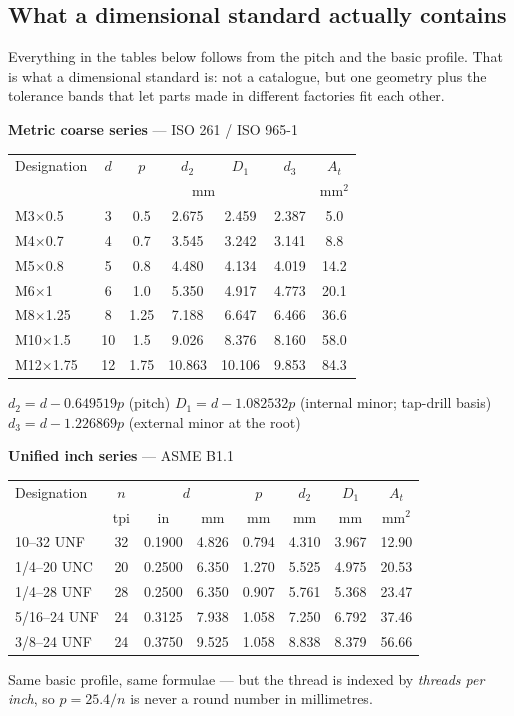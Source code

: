 \documentclass[11pt,a4paper]{article}
\begin{document}
\subsection{What a dimensional standard actually contains}

Everything in the tables below follows from the pitch and the basic profile. That is what a
dimensional standard is: not a catalogue, but one geometry plus the tolerance bands that let parts
made in different factories fit each other.

\begin{center}\footnotesize
\textbf{Metric coarse series} --- ISO 261 / ISO 965-1\\[3pt]
\begin{tabular}{@{}lcccccc@{}}
\toprule
Designation & $d$ & $p$ & $d_2$ & $D_1$ & $d_3$ & $A_t$\\
 & \multicolumn{5}{c}{mm} & mm$^2$\\
\midrule
M3$\times$0.5 & 3 & 0.5 & 2.675 & 2.459 & 2.387 & 5.0\\
M4$\times$0.7 & 4 & 0.7 & 3.545 & 3.242 & 3.141 & 8.8\\
M5$\times$0.8 & 5 & 0.8 & 4.480 & 4.134 & 4.019 & 14.2\\
M6$\times$1 & 6 & 1.0 & 5.350 & 4.917 & 4.773 & 20.1\\
M8$\times$1.25 & 8 & 1.25 & 7.188 & 6.647 & 6.466 & 36.6\\
M10$\times$1.5 & 10 & 1.5 & 9.026 & 8.376 & 8.160 & 58.0\\
M12$\times$1.75 & 12 & 1.75 & 10.863 & 10.106 & 9.853 & 84.3\\
\bottomrule
\end{tabular}

\smallskip
{\scriptsize $d_2=d-0.649519p$ (pitch) \quad $D_1=d-1.082532p$ (internal minor; tap-drill basis)
\quad $d_3=d-1.226869p$ (external minor at the root)}
\end{center}

\begin{center}\footnotesize
\textbf{Unified inch series} --- ASME B1.1\\[3pt]
\begin{tabular}{@{}lccccccc@{}}
\toprule
Designation & $n$ & \multicolumn{2}{c}{$d$} & $p$ & $d_2$ & $D_1$ & $A_t$\\
 & tpi & in & mm & mm & mm & mm & mm$^2$\\
\midrule
10--32 UNF & 32 & 0.1900 & 4.826 & 0.794 & 4.310 & 3.967 & 12.90\\
1/4--20 UNC & 20 & 0.2500 & 6.350 & 1.270 & 5.525 & 4.975 & 20.53\\
1/4--28 UNF & 28 & 0.2500 & 6.350 & 0.907 & 5.761 & 5.368 & 23.47\\
5/16--24 UNF & 24 & 0.3125 & 7.938 & 1.058 & 7.250 & 6.792 & 37.46\\
3/8--24 UNF & 24 & 0.3750 & 9.525 & 1.058 & 8.838 & 8.379 & 56.66\\
\bottomrule
\end{tabular}

\smallskip
{\scriptsize Same basic profile, same formulae --- but the thread is indexed by \emph{threads per
inch}, so $p=25.4/n$ is never a round number in millimetres.}
\end{center}
\end{document}
